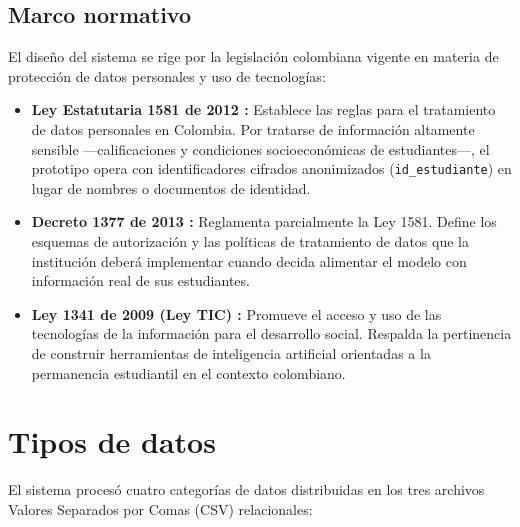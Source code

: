 \documentclass[12pt,letterpaper]{article}
\newcommand{\CSV}{Valores Separados por Comas (CSV)\xspace}
\begin{document}
\subsection{Marco normativo}

El diseño del sistema se rige por la legislación colombiana vigente en materia de protección de datos personales y uso de tecnologías:

\begin{itemize}
  \item \textbf{Ley Estatutaria 1581 de 2012 \parencite{ley1581}:} Establece las reglas para el tratamiento de datos personales en Colombia. Por tratarse de información altamente sensible —calificaciones y condiciones socioeconómicas de estudiantes—, el prototipo opera con identificadores cifrados anonimizados (\texttt{id\_estudiante}) en lugar de nombres o documentos de identidad.

  \item \textbf{Decreto 1377 de 2013 \parencite{decreto1377}:} Reglamenta parcialmente la Ley 1581. Define los esquemas de autorización y las políticas de tratamiento de datos que la institución deberá implementar cuando decida alimentar el modelo con información real de sus estudiantes.

  \item \textbf{Ley 1341 de 2009 (Ley TIC) \parencite{ley1341}:} Promueve el acceso y uso de las tecnologías de la información para el desarrollo social. Respalda la pertinencia de construir herramientas de inteligencia artificial orientadas a la permanencia estudiantil en el contexto colombiano.
\end{itemize}


\section{Tipos de datos}

El sistema procesó cuatro categorías de datos distribuidas en los tres archivos \CSV relacionales:
\end{document}
